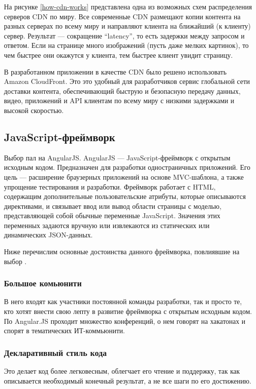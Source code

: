 На рисунке \ref{how-cdn-works} представлена одна из возможных схем распределения серверов CDN по миру.
Все современные CDN размещают копии контента на разных серверах по всему миру и направляют
клиента на ближайший (к клиенту) сервер. Результат — сокращение “latency”, то есть задержки
между запросом и ответом. Если на странице много изображений (пусть даже мелких картинок),
то чем быстрее они окажутся у клиента, тем быстрее клиент увидит страницу.

В разработанном приложении в качестве CDN было решено использовать Amazon CloudFront.
Это это удобный для разработчиков сервис глобальной сети доставки контента, обеспечивающий
быструю и безопасную передачу данных, видео, приложений и API клиентам по всему миру
с низкими задержками и высокой скоростью.

\subsection{JavaScript-фреймворк}

Выбор пал на AngularJS. AngularJS — JavaScript-фреймворк с открытым исходным кодом.
Предназначен для разработки одностраничных приложений. Его цель — расширение браузерных
приложений на основе MVC-шаблона, а также упрощение тестирования и разработки.
Фреймворк работает с HTML, содержащим дополнительные пользовательские атрибуты,
которые описываются директивами, и связывает ввод или вывод области страницы с моделью,
представляющей собой обычные переменные JavaScript. Значения этих переменных задаются
вручную или извлекаются из статических или динамических JSON-данных.

Ниже перечислим основные достоинства данного фреймворка, повлиявшие на выбор \cite{angular}.

\subsubsection*{Большое комьюнити}
В него входят как участники постоянной команды разработки,
так и просто те, кто хотят внести свою лепту в развитие фреймворка с открытым исходным
кодом. По Angular.JS проходит множество конференций, о нем говорят на хакатонах и спорят
в тематических ИТ-коммьюнити.
\subsubsection*{Декларативный стиль кода}
Это делает код более легковесным, облегчает его чтение и поддержку, так как
описывается необходимый конечный результат, а не все шаги по его достижению.
